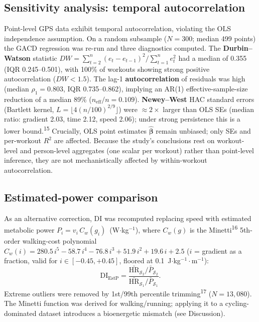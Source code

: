 \documentclass[12pt]{article}
\begin{document}
\subsection{Sensitivity analysis: temporal autocorrelation}
Point-level GPS data exhibit temporal autocorrelation, violating the OLS
independence assumption. On a random subsample ($N = 300$; median 499
points) the GACD regression was re-run and three diagnostics computed.
The \textbf{Durbin--Watson} statistic $DW=\sum_{t=2}^{n}(e_t-e_{t-1})^2/
\sum_{t=1}^{n}e_t^2$ had a median of 0.355 (IQR 0.245--0.501), with 100\%
of workouts showing strong positive autocorrelation ($DW<1.5$). The
lag-1 \textbf{autocorrelation} of residuals was high (median $\rho_1=0.803$,
IQR 0.735--0.862), implying an AR(1) effective-sample-size reduction of a
median 89\% ($n_{\mathrm{eff}}/n=0.109$). \textbf{Newey--West} HAC standard
errors (Bartlett kernel, $L=\lfloor 4(n/100)^{2/9}\rfloor$) were
$\approx 2\times$ larger than OLS SEs (median ratio: gradient 2.03, time
2.12, speed 2.06); under strong persistence this is a lower
bound.\textsuperscript{15} Crucially, OLS point estimates
$\hat{\bm\beta}$ remain unbiased; only SEs and per-workout $R^2$ are
affected. Because the study's conclusions rest on workout-level and
person-level aggregates (one scalar per workout) rather than point-level
inference, they are not mechanistically affected by within-workout
autocorrelation.

\subsection{Estimated-power comparison}
As an alternative correction, DI was recomputed replacing speed with
estimated metabolic power $P_i=v_i\,C_w(g_i)$~(W$\cdot$kg$^{-1}$), where
$C_w(g)$ is the Minetti\textsuperscript{16} 5th-order walking-cost
polynomial $C_w(i)=280.5\,i^5-58.7\,i^4-76.8\,i^3+51.9\,i^2+19.6\,i+2.5$
($i$ = gradient as a fraction, valid for $i\in[-0.45,+0.45]$, floored at
0.1~J$\cdot$kg$^{-1}\cdot$m$^{-1}$):
\begin{equation}
  \mathrm{DI}_{\mathrm{EstP}}=\frac{\bar{\mathrm{HR}}_{\mathcal{S}_2}/\bar P_{\mathcal{S}_2}}
                                    {\bar{\mathrm{HR}}_{\mathcal{S}_1}/\bar P_{\mathcal{S}_1}}.
  \label{eq:estp}
\end{equation}
Extreme outliers were removed by 1st/99th percentile
trimming\textsuperscript{17} ($N=13{,}080$). The Minetti function was
derived for walking/running; applying it to a cycling-dominated dataset
introduces a bioenergetic mismatch (see Discussion).
\end{document}
